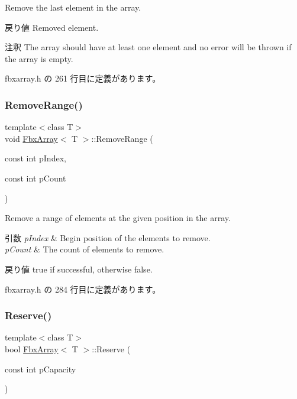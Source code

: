 Remove the last element in the array. \begin{DoxyReturn}{戻り値}
Removed element. 
\end{DoxyReturn}
\begin{DoxyRemark}{注釈}
The array should have at least one element and no error will be thrown if the array is empty. 
\end{DoxyRemark}


 fbxarray.\+h の 261 行目に定義があります。

\mbox{\label{class_fbx_array_a63331ed053272acd6262f374f535f170}} 
\subsubsection{\texorpdfstring{Remove\+Range()}{RemoveRange()}}
{\footnotesize\ttfamily template$<$class T$>$ \\
void \hyperlink{class_fbx_array}{Fbx\+Array}$<$ T $>$\+::Remove\+Range (\begin{DoxyParamCaption}\item[{const int}]{p\+Index,  }\item[{const int}]{p\+Count }\end{DoxyParamCaption})\hspace{0.3cm}{\ttfamily [inline]}}

Remove a range of elements at the given position in the array. 
\begin{DoxyParams}{引数}
{\em p\+Index} & Begin position of the elements to remove. \\
\hline
{\em p\+Count} & The count of elements to remove. \\
\hline
\end{DoxyParams}
\begin{DoxyReturn}{戻り値}
{\ttfamily true} if successful, otherwise {\ttfamily false}. 
\end{DoxyReturn}


 fbxarray.\+h の 284 行目に定義があります。

\mbox{\label{class_fbx_array_a7d5a64be591ee59708079c2c5fe0dd1b}} 
\subsubsection{\texorpdfstring{Reserve()}{Reserve()}}
{\footnotesize\ttfamily template$<$class T$>$ \\
bool \hyperlink{class_fbx_array}{Fbx\+Array}$<$ T $>$\+::Reserve (\begin{DoxyParamCaption}\item[{const int}]{p\+Capacity }\end{DoxyParamCaption})\hspace{0.3cm}{\ttfamily [inline]}}

